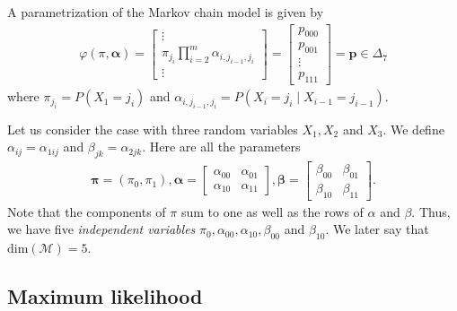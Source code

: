 \documentclass[a4paper, 11pt]{article}
\begin{document}
\begin{prop}
  A parametrization of the Markov chain model is given by 
  \begin{align*}
    \varphi(\pi, \pmb \alpha) =  \begin{bmatrix} \vdots \\
      \pi_{j_i} \prod^m_{i=2}\alpha_{i, j_{i-1}, j_i}     \\ \vdots \end{bmatrix}  = \begin{bmatrix}
      p_{000} \\ p_{001} \\ \vdots \\ p_{111}
    \end{bmatrix} = \mathbf p \in \Delta_7
  \end{align*}
  where \( \pi_{j_i} = P(X_1 = j_i) \) and \( \alpha_{i,j_{i-1}, j_i} = P(X_i = j_{i} \mid X_{i-1} = j_{i-1}) \).
\end{prop}

\begin{eg}
Let us consider the case with three random variables \( X_1, X_2 \) and \( X_3 \). We define \( \alpha_{ij} = \alpha_{1ij} \) and \( \beta_{jk} = \alpha_{2jk} \). Here are all the parameters 
\begin{align*}
  \pmb \pi = (\pi_0, \pi_1), \pmb \alpha = \begin{bmatrix}
    \alpha_{00} & \alpha_{01} \\ \alpha_{10} & \alpha_{11}
  \end{bmatrix}, \pmb \beta = \begin{bmatrix}
  \beta_{00} & \beta_{01} \\ \beta_{10} & \beta_{11} \end{bmatrix}.
\end{align*}
Note that the components of \( \pi \) sum to one as well as the rows of \( \alpha \) and \( \beta \). Thus, we have five \emph{independent variables} \( \pi_0, \alpha_{00}, \alpha_{10}, \beta_{00} \) and \( \beta_{10} \). We later say that \( \mathrm{dim}(\mathcal{M}) = 5 \).
\end{eg}


\subsection{Maximum likelihood}
\end{document}
